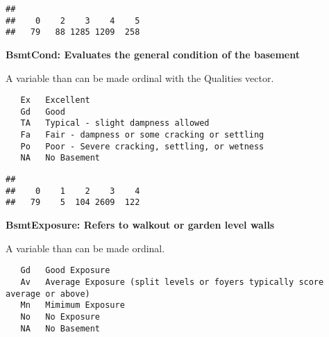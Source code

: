 \documentclass[]{article}
\newenvironment{Shaded}{\begin{snugshade}}{\end{snugshade}}
\newcommand{\KeywordTok}[1]{\textcolor[rgb]{0.13,0.29,0.53}{\textbf{#1}}}
\newcommand{\DecValTok}[1]{\textcolor[rgb]{0.00,0.00,0.81}{#1}}
\newcommand{\StringTok}[1]{\textcolor[rgb]{0.31,0.60,0.02}{#1}}
\newcommand{\OperatorTok}[1]{\textcolor[rgb]{0.81,0.36,0.00}{\textbf{#1}}}
\newcommand{\NormalTok}[1]{#1}
\begin{document}
\begin{verbatim}
## 
##    0    2    3    4    5 
##   79   88 1285 1209  258
\end{verbatim}

\textbf{BsmtCond: Evaluates the general condition of the basement}

A variable than can be made ordinal with the Qualities vector.

\begin{verbatim}
   Ex   Excellent
   Gd   Good
   TA   Typical - slight dampness allowed
   Fa   Fair - dampness or some cracking or settling
   Po   Poor - Severe cracking, settling, or wetness
   NA   No Basement
\end{verbatim}

\begin{Shaded}
\end{Shaded}

\begin{verbatim}
## 
##    0    1    2    3    4 
##   79    5  104 2609  122
\end{verbatim}

\textbf{BsmtExposure: Refers to walkout or garden level walls}

A variable than can be made ordinal.

\begin{verbatim}
   Gd   Good Exposure
   Av   Average Exposure (split levels or foyers typically score average or above)  
   Mn   Mimimum Exposure
   No   No Exposure
   NA   No Basement
\end{verbatim}

\begin{Shaded}
\end{Shaded}
\end{document}

